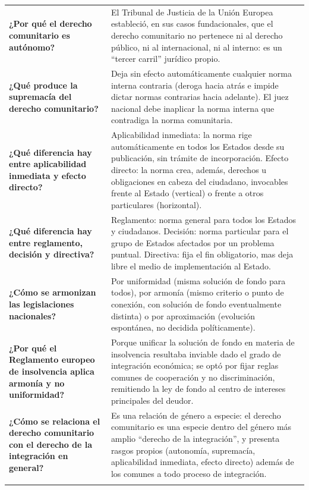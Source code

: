 \documentclass[12pt,oneside]{book}
\begin{document}
\begin{longtable}{
    >{\RaggedRight\arraybackslash}p{}
    >{\RaggedRight\arraybackslash}p{}
}
\textbf{¿Por qué el derecho comunitario es autónomo?} &
El Tribunal de Justicia de la Unión Europea estableció, en sus casos fundacionales, que el derecho comunitario no pertenece ni al derecho público, ni al internacional, ni al interno: es un ``tercer carril'' jurídico propio. \\
\addlinespace
\cmidrule{1-2}

\textbf{¿Qué produce la supremacía del derecho comunitario?} &
Deja sin efecto automáticamente cualquier norma interna contraria (deroga hacia atrás e impide dictar normas contrarias hacia adelante). El juez nacional debe inaplicar la norma interna que contradiga la norma comunitaria. \\
\addlinespace
\cmidrule{1-2}

\textbf{¿Qué diferencia hay entre aplicabilidad inmediata y efecto directo?} &
Aplicabilidad inmediata: la norma rige automáticamente en todos los Estados desde su publicación, sin trámite de incorporación. Efecto directo: la norma crea, además, derechos u obligaciones en cabeza del ciudadano, invocables frente al Estado (vertical) o frente a otros particulares (horizontal). \\
\addlinespace
\cmidrule{1-2}

\textbf{¿Qué diferencia hay entre reglamento, decisión y directiva?} &
Reglamento: norma general para todos los Estados y ciudadanos. Decisión: norma particular para el grupo de Estados afectados por un problema puntual. Directiva: fija el fin obligatorio, mas deja libre el medio de implementación al Estado. \\
\addlinespace
\cmidrule{1-2}

\textbf{¿Cómo se armonizan las legislaciones nacionales?} &
Por uniformidad (misma solución de fondo para todos), por armonía (mismo criterio o punto de conexión, con solución de fondo eventualmente distinta) o por aproximación (evolución espontánea, no decidida políticamente). \\
\addlinespace
\cmidrule{1-2}

\textbf{¿Por qué el Reglamento europeo de insolvencia aplica armonía y no uniformidad?} &
Porque unificar la solución de fondo en materia de insolvencia resultaba inviable dado el grado de integración económica; se optó por fijar reglas comunes de cooperación y no discriminación, remitiendo la ley de fondo al centro de intereses principales del deudor. \\
\addlinespace
\cmidrule{1-2}

\textbf{¿Cómo se relaciona el derecho comunitario con el derecho de la integración en general?} &
Es una relación de género a especie: el derecho comunitario es una especie dentro del género más amplio ``derecho de la integración'', y presenta rasgos propios (autonomía, supremacía, aplicabilidad inmediata, efecto directo) además de los comunes a todo proceso de integración. \\
\addlinespace
\cmidrule{1-2}


\end{longtable}
\end{document}
